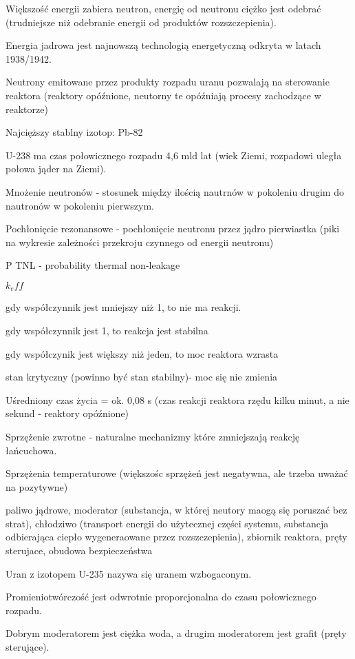 \documentclass{article}
\begin{document}
Większość energii zabiera neutron, energię od neutronu ciężko jest odebrać (trudniejsze niż odebranie energii od produktów rozszczepienia).

Energia jadrowa jest najnowszą technologią energetyczną odkryta w latach 1938\slash 1942.

Neutrony emitowane przez produkty rozpadu uranu pozwalają na sterowanie reaktora (reaktory opóźnione, neutorny te opóźniają procesy zachodzące w reaktorze)

Najcięższy stablny izotop: Pb-82

U-238 ma czas połowicznego rozpadu 4,6 mld lat (wiek Ziemi, rozpadowi uległa połowa jąder na Ziemi).

Mnożenie neutronów - stosunek między ilością nautrnów w pokoleniu drugim do nautronów w pokoleniu pierwszym.

Pochłonięcie rezonansowe - pochłonięcie neutronu przez jądro pierwiastka (piki na wykresie zależności przekroju czynnego od energii neutronu)

P TNL - probability thermal non-leakage

$k_eff$

gdy współczynnik jest mniejszy niż 1, to nie ma reakcji.

gdy współczynnik jest 1, to reakcja jest stabilna

gdy współczynik jest większy niż jeden, to moc reaktora wzrasta

stan krytyczny (powinno być stan stabilny)- moc się nie zmienia

Uśredniony czas życia = ok. 0,08 s (czas reakcji reaktora rzędu kilku minut, a nie sekund - reaktory opóźnione)

Sprzężenie zwrotne - naturalne mechanizmy które zmniejszają reakcję łańcuchowa.

Sprzężenia temperaturowe (większośc sprzężeń jest negatywna, ale trzeba uważać na pozytywne)

paliwo jądrowe, moderator (substancja, w której neutory maogą się poruszać bez strat), chłodziwo (transport energii do użytecznej części systemu, substancja odbierająca ciepło wygeneraowane przez rozszczepienia), zbiornik reaktora, pręty sterujace, obudowa bezpieczeństwa

Uran z izotopem U-235 nazywa się uranem wzbogaconym.

Promieniotwórczość jest odwrotnie proporcjonalna do czasu połowicznego rozpadu.

Dobrym moderatorem jest ciężka woda, a drugim moderatorem jest grafit (pręty sterujące).
\end{document}
